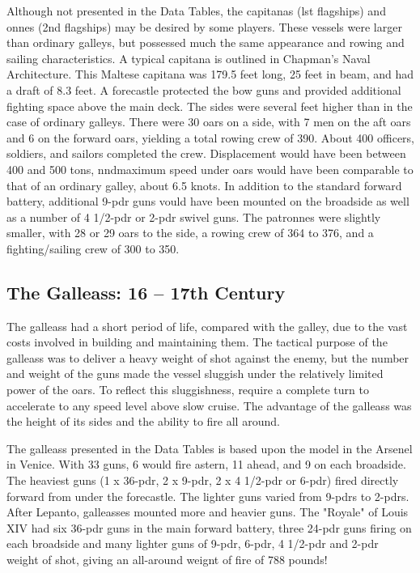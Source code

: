 \documentclass{article}
\begin{document}
\begin{multicols}{3}
Although not presented in the Data Tables, the capitanas (lst
flagships) and onnes (2nd flagships) may be desired by some players.
These vessels were larger than ordinary galleys, but possessed much
the same appearance and rowing and sailing characteristics.  A typical
capitana is outlined in Chapman's Naval Architecture.  This Maltese
capitana was 179.5 feet long, 25 feet in beam, and had a draft of 8.3
feet.  A forecastle protected the bow guns and provided additional
fighting space above the main deck.  The sides were several feet
higher than in the case of ordinary galleys.  There were 30 oars on a
side, with 7 men on the aft oars and 6 on the forward oars, yielding a
total rowing crew of 390.  About 400 officers, soldiers, and sailors
completed the crew.  Displacement would have been between 400 and 500
tons, nndmaximum speed under oars would have been comparable to that
of an ordinary galley, about 6.5 knots.  In addition to the standard
forward battery, additional 9-pdr guns vould have been mounted on the
broadside as well as a number of 4 1/2-pdr or 2-pdr swivel guns.  The
patronnes were slightly smaller, with 28 or 29 oars to the side, a
rowing crew of 364 to 376, and a fighting/sailing crew of 300 to 350.

\subsection{The Galleass:  16 -- 17th Century}

The galleass had a short period of life, compared with the galley, due
to the vast costs involved in building and maintaining them.  The
tactical purpose of the galleass was to deliver a heavy weight of shot
against the enemy, but the number and weight of the guns made the
vessel sluggish under the relatively limited power of the oars. To
reflect this sluggishness, require a complete turn to accelerate to
any speed level above slow cruise.  The advantage of the galleass was
the height of its sides and the ability to fire all around.

The galleass presented in the Data Tables is based upon the model in
the Arsenel in Venice.  With 33 guns, 6 would fire astern, 11 ahead,
and 9 on each broadside.  The heaviest guns (1 x 36-pdr, 2 x 9-pdr, 2
x 4 1/2-pdr or 6-pdr) fired directly forward from under the
forecastle.  The lighter guns varied from 9-pdrs to 2-pdrs.  After
Lepanto, galleasses mounted more and heavier guns.  The "Royale" of
Louis XIV had six 36-pdr guns in the main forward battery, three
24-pdr guns firing on each broadside and many lighter guns of 9-pdr,
6-pdr, 4 1/2-pdr and 2-pdr weight of shot, giving an all-around
weignt of fire of 788 pounds!


\end{multicols}
\end{document}
